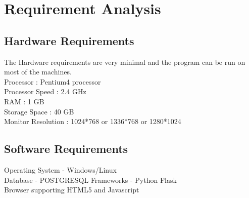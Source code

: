 \chapter{Requirement Analysis}

\section{Hardware Requirements}
The Hardware requirements are very minimal and the program can be run on most of
the machines. \\
Processor : Pentium4 processor\\
Processor Speed : 2.4 GHz\\
RAM : 1 GB\\
Storage Space : 40 GB\\
Monitor Resolution : 1024*768 or 1336*768 or 1280*1024\\
\thispagestyle{fancy}

\section{Software Requirements}
Operating System - Windows/Linux\\
Database - POSTGRESQL
Frameworks - Python Flask\\
Browser supporting HTML5 and Javascript

